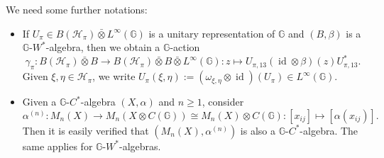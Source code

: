\documentclass[reqno]{amsart}
\numberwithin{equation}{section}
\DeclareMathOperator{\id}{\mathrm{id}}
\newcommand{\G}{\mathbb{G}}
\newcommand{\ovot}{\bar{\otimes}}
\begin{document}
We need some further notations:
\begin{itemize}
    \item If $U_\pi\in B(\mathcal{H}_\pi)\ovot L^\infty(\G)$ is a unitary representation of $\G$ and $(B, \beta)$ is a $\G$-$W^*$-algebra, then we obtain a $\G$-action 
$$\gamma_\pi: B(\mathcal{H}_\pi)\ovot B \to B(\mathcal{H}_\pi)\ovot B \ovot  L^\infty(\G): z \mapsto U_{\pi, 13}(\id \otimes \beta)(z)U_{\pi, 13}^*.$$
Given $\xi, \eta \in \mathcal{H}_\pi$, we write $U_\pi(\xi, \eta):= (\omega_{\xi, \eta} \otimes \id)(U_\pi)\in L^\infty(\G)$.
\item Given a $\G$-$C^*$-algebra $(X, \alpha)$ and $n\ge 1$, consider 
$$\alpha^{(n)}: M_n(X)\to M_n(X\otimes C(\G))\cong M_n(X)\otimes C(\G): [x_{ij}]\mapsto [\alpha(x_{ij})].$$
Then it is easily verified that $(M_n(X), \alpha^{(n)})$ is also a $\G$-$C^*$-algebra. The same applies for $\G$-$W^*$-algebras.
\end{itemize}
\end{document}
